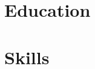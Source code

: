 \documentclass[11pt,a4paper]{article}
\begin{document}
\section{Education}

\section{Skills}
\end{document}
